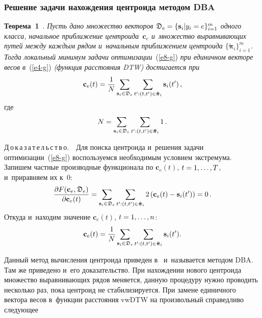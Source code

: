 \begin{multicols}{2}
\subsubsection{Решение задачи нахождения центроида методом DBA}

\noindent
\textbf{Теорема~1}~\cite{DBA}. 
\textit{Пусть дано множество векторов $\fD_e \hm= \{\mathbf{s}_i|y_i=e\}_{i=1}^{m}$ 
одного класса, начальное приближение центроида~$\mathbf{c}_e$ и~множество 
выравнивающих путей между каждым рядом и~начальным приближением 
центроида $\{\boldsymbol{\tilde{\pi}}_i\}_{i=1}^m$. Тогда локальный 
минимум задачи оптимизации}~(\ref{e8-g}) \textit{при единичном векторе весов 
в}~(\ref{e4-g}) \textit{(функция расстояния DTW) достигается при}
\begin{equation*}
\mathbf{c}_e(t) = \displaystyle\frac{\displaystyle 1\mathstrut}{\displaystyle N\mathstrut}\sum\limits_{\mathbf{s}_i \in 
\mathfrak{D}_e}\sum\limits_{t' : (t,t') \in \boldsymbol{\tilde{\pi}}_i}\textbf{s}_i(t')\,,
\end{equation*}
где
$$
N = \sum\limits_{\mathbf{s}_i \in \mathfrak{D}_e}
\sum\limits_{t' : (t,t') \in \boldsymbol{\tilde{\pi}}_i}1\,.
$$


\noindent
Д\,о\,к\,а\,з\,а\,т\,е\,л\,ь\,с\,т\,в\,о.\ \ 
Для поиска центроида и~решения задачи оптимизации~(\ref{e8-g}) 
воспользуемся необходимым условием экстремума. Запишем частные производные 
функционала по $\mathbf{c}_e(t)$, $t \hm= 1,\dots,T$, и~приравняем их к~0:
\begin{equation*}
\displaystyle\frac{\displaystyle \partial F(\mathbf{c}_e,\mathfrak{D}_e)\mathstrut}{\displaystyle \partial \mathbf{c}_e(t)\mathstrut} = 
\sum\limits_{\mathbf{s}_i \in \mathfrak{D}_e}
\sum\limits_{t' : (t,t') \in \boldsymbol{\tilde{\pi}}_i}2
\left(\mathbf{c}_e(t) - \mathbf{s}_i(t')\right)=0\,.
\end{equation*}
Откуда и~находим значение $\mathbf{c}_e(t)$, $t \hm= 1,\ldots,n$:
\begin{equation*}
\mathbf{c}_e(t) = \displaystyle\frac{\displaystyle 1\mathstrut}{\displaystyle N\mathstrut}\sum\limits_{\mathbf{s}_i \in \mathfrak{D}_e}
{\sum\limits_{t' : (t,t') \in \boldsymbol{\tilde{\pi}}_i}\mathbf{s}_i(t')}.
\end{equation*}


Данный метод вычисления центроида приведен в~\cite{DBA} 
и~называется методом DBA. Там же приведено и~его доказательство. 
При нахождении нового центроида множество выравнивающих рядов меняется, 
данную процедуру нужно проводить несколько раз, пока центроид не стабилизируется. 
При замене единичного вектора весов в~функции расстояния vwDTW на произвольный 
справедливо следующее

\smallskip


\end{multicols}
